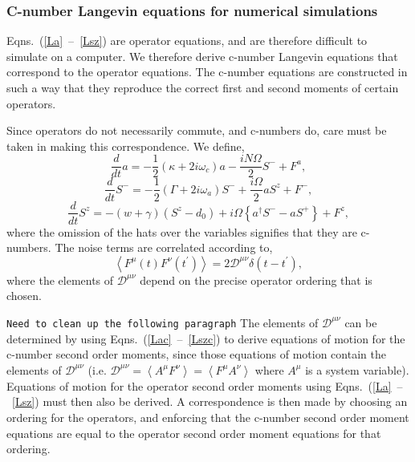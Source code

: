 \documentclass[aps,prl,twocolumn,
superscriptaddress,groupedaddress]{revtex4}
\newcommand{\dmcomment}[1]{{\tt #1}}
\begin{document}
\subsubsection{C-number Langevin equations for numerical simulations}

Eqns.~(\ref{La}~--~\ref{Lsz}) are operator equations, and are therefore
difficult to simulate on a computer. We therefore derive c-number
Langevin equations that correspond to the operator equations.  The
c-number equations are constructed in such a way that they reproduce the
correct first and second moments of certain operators.

Since operators do not necessarily commute, and c-numbers do, care must
be taken in making this correspondence. We define,
\begin{equation}
\frac{d}{dt} a= -\frac{1}{2}  (\kappa +2i\omega_c) a
-\frac{i N \Omega}{2} S^{-}
+F^{a},
\label{Lac}
\end{equation}
\begin{equation}
\frac{d}{dt} S^{-} = -\frac{1}{2}  \left(\Gamma +2 i \omega_a \right)  S^{-}
+\frac{i \Omega}{2} a S^{z}
+F^{-},
\end{equation}
\begin{equation}
\frac{d}{dt} S^{z} = -(w+\gamma)\left( S^{z} - d_0\right)
+i\Omega \left\{ a^{\dagger}S^{-} - a S^{+} \right\}
\label{Lszc}
+F^{z},
\end{equation}
where the omission of the hats over the variables signifies that they
are c-numbers. The noise terms are correlated according to,
\begin{equation}
\left< F^{\mu}(t) F^{\nu}(t^{\prime})\right> =
2 \mathscr{D}^{\mu \nu} \delta(t-t^{\prime}),
\end{equation}
where the elements of $\mathscr{D}^{\mu \nu}$ depend on the precise
operator ordering that is chosen.

\dmcomment{Need to clean up the following paragraph}
The elements of $\mathscr{D}^{\mu \nu}$ can be determined by using
Eqns.~(\ref{Lac}~--~\ref{Lszc}) to derive equations of motion for the
c-number second order moments, since those equations of motion contain
the elements of $\mathscr{D}^{\mu \nu}$ (i.e. $\mathscr{D}^{\mu \nu} =
\left<A^{\mu}F^{\nu}\right>=\left<F^{\mu}A^{\nu}\right>$ where $A^{\mu}$
is a system variable). Equations of motion for the operator second order
moments using Eqns.~(\ref{La}~--~\ref{Lsz}) must then also be derived. A
correspondence is then made by choosing an ordering for the operators,
and enforcing that the c-number second order moment equations are equal
to the operator second order moment equations for that ordering.
\end{document}
